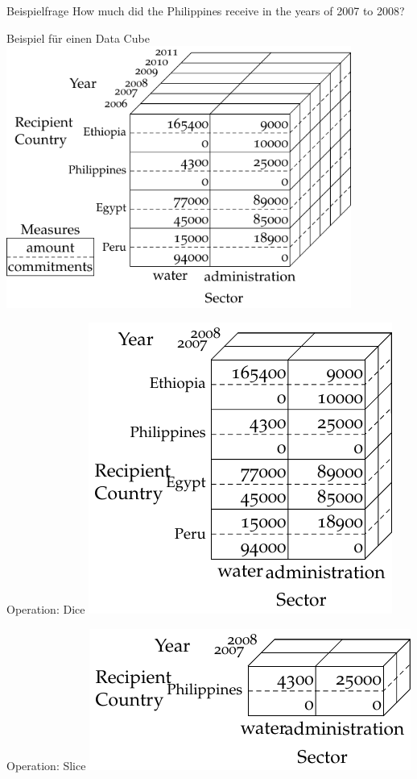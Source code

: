 \documentclass[14pt,aspectratio=1610]{beamer}
\begin{document}
\begin{frame}{Beispielfrage}
\centering\large
How much did the Philippines receive in the years of 2007 to 2008?
\end{frame}

\begin{frame}{Beispiel für einen Data Cube}
\includegraphics[width=0.85\textwidth]{img/datacube-full.pdf}
\end{frame}

\begin{frame}{Operation: Dice}
\includegraphics[width=0.65\columnwidth]{img/datacube-dice.pdf}
\end{frame}

\begin{frame}{Operation: Slice}
\includegraphics[width=0.65\columnwidth]{img/datacube-slice.pdf}
\end{frame}
\end{document}
